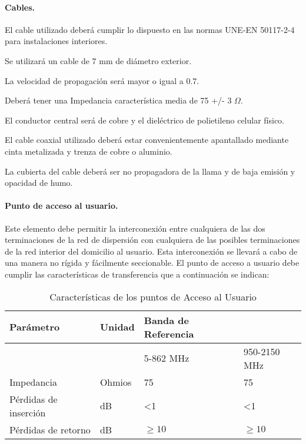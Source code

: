 \paragraph{Cables.}

El cable utilizado deberá cumplir lo dispuesto en las normas UNE-EN 50117-2-4 para instalaciones interiores.

Se utilizará un cable de 7 mm de diámetro exterior.

La velocidad de propagación será mayor o igual a 0.7.

Deberá tener una Impedancia característica media de 75 +/- 3 $\Omega$.

El conductor central será de cobre y el dieléctrico de polietileno celular físico. 

El cable coaxial utilizado deberá estar convenientemente apantallado mediante cinta metalizada y trenza de cobre o aluminio. 

La cubierta del cable deberá ser no propagadora de la llama y de baja emisión y opacidad de humo.

\paragraph{Punto de acceso al usuario.}

Este elemento debe permitir la interconexión entre cualquiera de las dos terminaciones de la red de dispersión con cualquiera de las posibles terminaciones de la red interior del domicilio al usuario. Esta interconexión se llevará a cabo de una manera no rígida y fácilmente seccionable. El punto de acceso a usuario debe cumplir las características de transferencia que a continuación se indican:

\begin{table}[H]
\caption{Características de los puntos de Acceso al Usuario}
\centering
\label{caracPAUs}
\begin{tabular}{l l l l }
    Parámetro & Unidad & Banda de Referencia & \\
    \hline
    \hline
    & & 5-862 MHz & 950-2150 MHz \\
    Impedancia & Ohmios & 75 & 75 \\
    Pérdidas de inserción & dB & <1 & <1 \\
    Pérdidas de retorno  & dB & $\geq 10$ & $\geq 10$ \\

\end{tabular}
\end{table}


